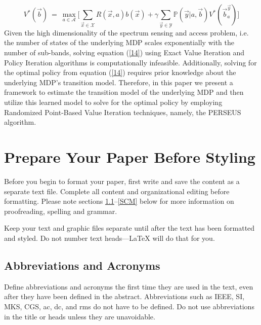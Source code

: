 \documentclass[conference]{IEEEtran}
\begin{document}
\begin{equation}\label{14}
    V^*(\vec{b})\ =\ \max_{a \in \mathcal{A}}\Big[\sum_{\vec{x} \in \mathcal{X}}R(\vec{x},a)b(\vec{x}) + \gamma \sum_{\vec{y} \in \mathcal{Y}}\mathbb{P}(\vec{y}|a,\vec{b})V^*(\vec{b}_a^{\vec{y}})\Big]
\end{equation}
Given the high dimensionality of the spectrum sensing and access problem, i.e. the number of states of the underlying MDP scales exponentially with the number of sub-bands, solving equation (\ref{14}) using Exact Value Iteration and Policy Iteration algorithms is computationally infeasible. Additionally, solving for the optimal policy from equation (\ref{14}) requires prior knowledge about the underlying MDP's transition model. Therefore, in this paper we present a framework to estimate the transition model of the underlying MDP and then utilize this learned model to solve for the optimal policy by employing Randomized Point-Based Value Iteration techniques, namely, the PERSEUS algorithm.
\section{Prepare Your Paper Before Styling}
Before you begin to format your paper, first write and save the content as a 
separate text file. Complete all content and organizational editing before 
formatting. Please note sections \ref{AA}--\ref{SCM} below for more information on 
proofreading, spelling and grammar.

Keep your text and graphic files separate until after the text has been 
formatted and styled. Do not number text heads---{\LaTeX} will do that 
for you.

\subsection{Abbreviations and Acronyms}\label{AA}
Define abbreviations and acronyms the first time they are used in the text, 
even after they have been defined in the abstract. Abbreviations such as 
IEEE, SI, MKS, CGS, ac, dc, and rms do not have to be defined. Do not use 
abbreviations in the title or heads unless they are unavoidable.
\end{document}
